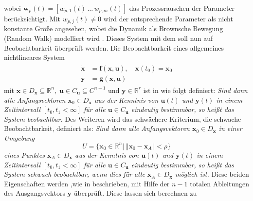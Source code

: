 wobei $\pmb{w}_p(t) = [w_{p,1}(t)\, \dots \, w_{p,m}(t)]$ das Prozessrauschen der Parameter berücksichtigt. Mit $w_{p,j}(t) \neq 0$ wird der entsprechende Parameter als nicht konstante Größe angesehen, wobei die Dynamik als Brownsche Bewegung (Random Walk) modelliert wird \cite[S. 447]{Bohn.2016}. Dieses System mit dem soll nun auf Beobachtbarkeit überprüft werden. Die Beobachtbarkeit eines allgemeines nichtlineares System 
\begin{align}\label{eq:general_nl}
\begin{split}
\pmb{\dot{x}} &= \pmb{f}(\pmb{x},\pmb{u}),\quad \pmb{x}(t_0) = \pmb{x}_0\\
\pmb{y} &= \pmb{g}(\pmb{x},\pmb{u})
\end{split}
\end{align}
mit $\pmb{x} \in D_{\pmb{x}} \subseteq \mathbb{R}^n,\;\pmb{u} \in C_{\pmb{u}} \subseteq C^{n-1}$ und $\pmb{y} \in \mathbb{R}^r$ ist in \cite{Adamy.2018} wie folgt definiert: \emph{Sind dann alle Anfangsvektoren $\pmb{x}_0 \in D_{\pmb{x}}$ aus der Kenntnis von $\pmb{u}(t)$ und $\pmb{y}(t)$ in einem Zeitintervall $[t_0, t_1 < \infty]$ für alle $\pmb{u} \in C_{\pmb{u}}$ eindeutig bestimmbar, so heißt das System beobachtbar.} Des Weiteren wird das schwächere Kriterium, die schwache Beobachtbarkeit, definiert als: \emph{Sind dann alle Anfangsvektoren $\pmb{x}_0 \in D_{\pmb{x}}$  in einer Umgebung}
\begin{equation}\label{eq:U_Obs}
 U = \lbrace\pmb{x}_0 \in \mathbb{R}^n \vert\; \Vert \pmb{x}_0-\pmb{x}_A \Vert < \rho\rbrace
\end{equation}
\emph{eines Punktes $\pmb{x}_A \in D_{\pmb{x}}$ aus der Kenntnis von $\pmb{u}(t)$ und $\pmb{y}(t)$ in einem Zeitintervall $[t_0, t_1 < \infty]$ für alle $\pmb{u} \in C_{\pmb{u}}$ eindeutig bestimmbar, so heißt das System schwach beobachtbar, wenn dies für alle $\pmb{x}_A \in D_{\pmb{x}}$ möglich ist.}
Diese beiden Eigenschaften werden ,wie in \cite{Adamy.2018} beschrieben, mit Hilfe der $n-1$ totalen Ableitungen des Ausgangsvektors $\pmb{y}$ überprüft. Diese lassen sich berechnen zu 
